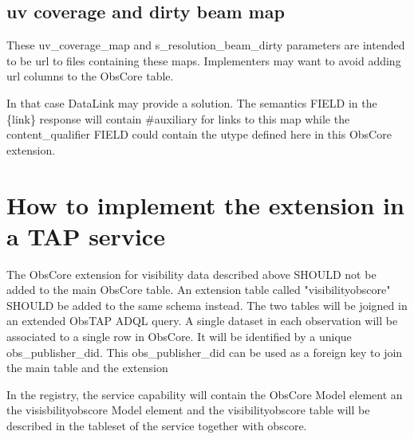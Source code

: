 \documentclass[11pt,a4paper]{ivoa}
\begin{document}
\subsection{uv coverage and dirty beam map}

These uv\_coverage\_map and s\_resolution\_beam\_dirty parameters are  intended to be url to 
files containing these maps. 
Implementers may want to avoid adding url columns to the ObsCore table. 

In that case DataLink \citep{std:DataLink} may provide a solution. The semantics FIELD in the 
\{link\} response  will contain \#auxiliary  for links to this map while  the content\_qualifier 
FIELD could contain the utype defined here in this ObsCore extension.


\section{How to implement the extension in a TAP service}

The ObsCore extension for visibility data described above SHOULD not be added to the main ObsCore table. An extension table called "visibilityobscore" SHOULD be added to the same schema instead. The two tables will be joigned in an extended ObsTAP ADQL query. A single dataset in each observation will be associated to a single row in ObsCore. It will be identified by a unique obs\_publisher\_did. This obs\_publisher\_did can be used as a foreign key to join the main table and the extension

In the registry, the service capability will contain the ObsCore Model element an the visisbilityobscore Model element   and the visibilityobscore table will be described in the tableset of the service together with obscore.  
\end{document}
